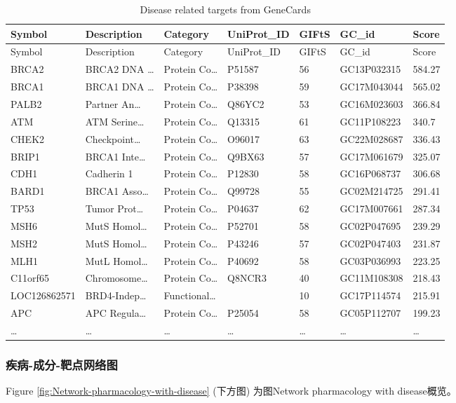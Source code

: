 \documentclass[
]{article}
\begin{document}
\begin{longtable}[]{@{}lllllll@{}}
\caption{\label{tab:Disease-related-targets-from-GeneCards}Disease related targets from GeneCards}\tabularnewline
\toprule
Symbol & Description & Category & UniProt\_ID & GIFtS & GC\_id & Score\tabularnewline
\midrule
\endfirsthead
\toprule
Symbol & Description & Category & UniProt\_ID & GIFtS & GC\_id & Score\tabularnewline
\midrule
\endhead
BRCA2 & BRCA2 DNA \ldots{} & Protein Co\ldots{} & P51587 & 56 & GC13P032315 & 584.27\tabularnewline
BRCA1 & BRCA1 DNA \ldots{} & Protein Co\ldots{} & P38398 & 59 & GC17M043044 & 565.02\tabularnewline
PALB2 & Partner An\ldots{} & Protein Co\ldots{} & Q86YC2 & 53 & GC16M023603 & 366.84\tabularnewline
ATM & ATM Serine\ldots{} & Protein Co\ldots{} & Q13315 & 61 & GC11P108223 & 340.7\tabularnewline
CHEK2 & Checkpoint\ldots{} & Protein Co\ldots{} & O96017 & 63 & GC22M028687 & 336.43\tabularnewline
BRIP1 & BRCA1 Inte\ldots{} & Protein Co\ldots{} & Q9BX63 & 57 & GC17M061679 & 325.07\tabularnewline
CDH1 & Cadherin 1 & Protein Co\ldots{} & P12830 & 58 & GC16P068737 & 306.68\tabularnewline
BARD1 & BRCA1 Asso\ldots{} & Protein Co\ldots{} & Q99728 & 55 & GC02M214725 & 291.41\tabularnewline
TP53 & Tumor Prot\ldots{} & Protein Co\ldots{} & P04637 & 62 & GC17M007661 & 287.34\tabularnewline
MSH6 & MutS Homol\ldots{} & Protein Co\ldots{} & P52701 & 58 & GC02P047695 & 239.29\tabularnewline
MSH2 & MutS Homol\ldots{} & Protein Co\ldots{} & P43246 & 57 & GC02P047403 & 231.87\tabularnewline
MLH1 & MutL Homol\ldots{} & Protein Co\ldots{} & P40692 & 58 & GC03P036993 & 223.25\tabularnewline
C11orf65 & Chromosome\ldots{} & Protein Co\ldots{} & Q8NCR3 & 40 & GC11M108308 & 218.43\tabularnewline
LOC126862571 & BRD4-Indep\ldots{} & Functional\ldots{} & & 10 & GC17P114574 & 215.91\tabularnewline
APC & APC Regula\ldots{} & Protein Co\ldots{} & P25054 & 58 & GC05P112707 & 199.23\tabularnewline
\ldots{} & \ldots{} & \ldots{} & \ldots{} & \ldots{} & \ldots{} & \ldots{}\tabularnewline
\bottomrule
\end{longtable}

\hypertarget{ux75beux75c5-ux6210ux5206-ux9776ux70b9ux7f51ux7edcux56fe}{%
\subsubsection{疾病-成分-靶点网络图}\label{ux75beux75c5-ux6210ux5206-ux9776ux70b9ux7f51ux7edcux56fe}}

Figure \ref{fig:Network-pharmacology-with-disease} (下方图) 为图Network pharmacology with disease概览。
\end{document}
